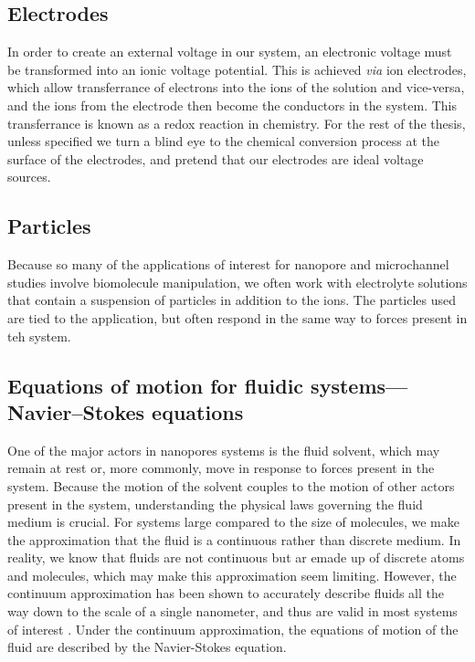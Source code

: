 		\subsection{Electrodes}
		
			In order to create an external voltage in our system, an electronic voltage must be transformed into an ionic voltage potential. This is achieved \textit{via} ion electrodes, which allow transferrance of electrons into the ions of the solution and vice-versa, and the ions from the electrode then become the conductors in the system. This transferrance is known as a redox reaction in chemistry. For the rest of the thesis, unless specified we turn a blind eye to the chemical conversion process at the surface of the electrodes, and pretend that our electrodes are ideal voltage sources.
			
		\subsection{Particles}
		
			Because so many of the applications of interest for nanopore and microchannel studies involve biomolecule manipulation, we often work with electrolyte solutions that contain a suspension of particles in addition to the ions. The particles used are tied to the application, but often respond in the same way to forces present in teh system.

		\subsection{Equations of motion for fluidic systems---Navier--Stokes equations}
		
			One of the major actors in nanopores systems is the fluid solvent, which may remain at rest or, more commonly, move in response to forces present in the system. Because the motion of the solvent couples to the motion of other actors present in the system, understanding the physical laws governing the fluid medium is crucial. For systems large compared to the size of molecules, we make the approximation that the fluid is a continuous rather than discrete medium. In reality, we know that fluids are not continuous but ar emade up of discrete atoms and molecules, which may make this approximation seem limiting. However, the continuum approximation has been shown to accurately describe fluids all the way down to the scale of a single nanometer, and thus are valid in most systems of interest \cite{Bocquet2010}. Under the continuum approximation, the equations of motion of the fluid are described by the Navier-Stokes equation.
			
